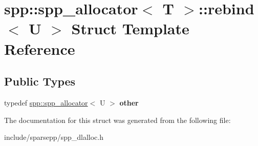 \hypertarget{structspp_1_1spp__allocator_1_1rebind}{}\section{spp\+:\+:spp\+\_\+allocator$<$ T $>$\+:\+:rebind$<$ U $>$ Struct Template Reference}
\label{structspp_1_1spp__allocator_1_1rebind}
\subsection*{Public Types}
\begin{DoxyCompactItemize}
\item 
typedef \hyperlink{classspp_1_1spp__allocator}{spp\+::spp\+\_\+allocator}$<$ U $>$ {\bfseries other}\hypertarget{structspp_1_1spp__allocator_1_1rebind_abc3106fefc57a708879bcdae57eba2c2}{}\label{structspp_1_1spp__allocator_1_1rebind_abc3106fefc57a708879bcdae57eba2c2}

\end{DoxyCompactItemize}


The documentation for this struct was generated from the following file\+:\begin{DoxyCompactItemize}
\item 
include/sparsepp/spp\+\_\+dlalloc.\+h\end{DoxyCompactItemize}
